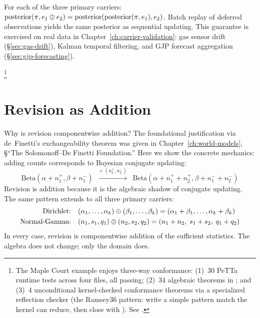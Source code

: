 \documentclass[11pt,openany]{report}
\begin{document}
\begin{theorem}
\label{thm:sleep-consolidation}
For each of the three primary carriers:
$\mathrm{posterior}(\pi, e_1 \oplus e_2)
= \mathrm{posterior}(\mathrm{posterior}(\pi, e_1), e_2)$.
Batch replay of deferred observations yields the same posterior as
sequential updating.  This guarantee is exercised on real data in
Chapter~\ref{ch:carrier-validation}: gas sensor drift
(\S\ref{sec:gas-drift}), Kalman temporal filtering, and GJP
forecast aggregation (\S\ref{sec:gjp-forecasting}).
\end{theorem}

%
\footnote{The Maple Court example enjoys three-way conformance:
(1)~30 PeTTa runtime tests across four  files, all
passing; (2)~34 algebraic theorems in
; and
(3)~4 unconditional kernel-checked conformance theorems via a
specialized reflection checker (the Ramsey36 pattern: write a
simple pattern match the kernel can reduce, then close with
).  See
.}


\section{Revision as Addition}

Why is revision componentwise addition?  The foundational justification
via de~Finetti's exchangeability theorem was given in
Chapter~\ref{ch:world-models}, \S``The Solomonoff--De Finetti
Foundation.''  Here we show the concrete mechanics: adding counts
corresponds to Bayesian conjugate updating:
\[
  \text{Beta}(\alpha + n_1^+, \beta + n_1^-)
  \;\;\xrightarrow{+\;(n_2^+, n_2^-)}\;\;
  \text{Beta}(\alpha + n_1^+ + n_2^+, \beta + n_1^- + n_2^-)
\]
Revision is addition because it is the algebraic shadow of conjugate
updating.  The same pattern extends to all three primary carriers:
\begin{align*}
  \text{Dirichlet:}\quad
  &(\alpha_1, \ldots, \alpha_k) \oplus (\beta_1, \ldots, \beta_k)
  = (\alpha_1 + \beta_1, \ldots, \alpha_k + \beta_k) \\
  \text{Normal-Gamma:}\quad
  &(n_1, s_1, q_1) \oplus (n_2, s_2, q_2)
  = (n_1 + n_2,\; s_1 + s_2,\; q_1 + q_2)
\end{align*}
In every case, revision is componentwise addition of the sufficient
statistics.  The algebra does not change; only the domain does.
\end{document}
